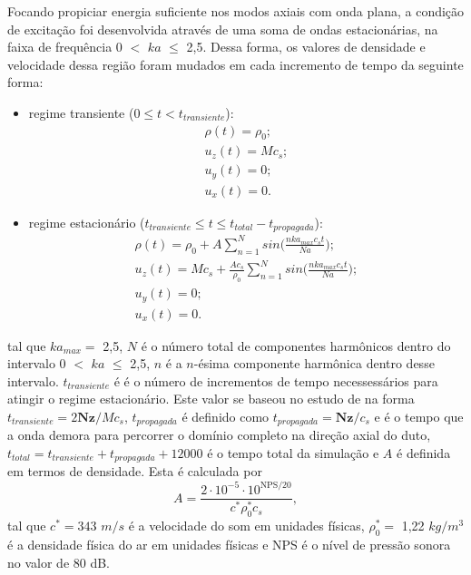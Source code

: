 Focando propiciar energia suficiente nos modos axiais com onda plana, a condição de excitação foi desenvolvida através de uma soma de ondas estacionárias, na faixa de frequência $0$ $<$ $ka$ $\leq$ 2,5. Dessa forma, os valores de densidade e velocidade dessa região foram mudados em cada incremento de tempo da seguinte forma:
\begin{itemize}
  \item regime transiente ($0 \leq t < t_{transiente}$):
  \begin{gather*}
    \rho(t) = \rho_{0};%
    \\ u_{z}(t) = Mc_{s};    
    \\ u_{y}(t) = 0;
    \\ u_{x}(t) = 0.
  \label{eq:transiente}
  \end{gather*}

  \item regime estacionário ($t_{transiente} \leq t \leq t_{total} - t_{propagada}$):
  \begin{gather*}
    \rho(t) = \rho_{0} + A\sum_{n=1}^{N} sin\bigg(\frac{nka_{max}c_{s}t}{Na}\bigg);
    \\ u_{z}(t) = Mc_{s} + \frac{Ac_{s}}{\rho_{0}}\sum_{n=1}^{N} sin\bigg(\frac{nka_{max}c_{s}t}{Na}\bigg);    
    \\ u_{y}(t) = 0;
    \\ u_{x}(t) = 0.
  \label{eq:estacionario}
  \end{gather*}
\end{itemize}
tal que $ka_{max} =$ 2,5, $N$ é o número total de componentes harmônicos dentro do intervalo $0$ $<$ $ka$ $\leq$ 2,5, $n$ é a $n$-ésima componente harmônica dentro desse intervalo. $t_{transiente}$ é é o número de incrementos de tempo necessessários para atingir o regime estacionário. Este valor se baseou no estudo de  na forma $t_{transiente} =  2\textbf{Nz}/Mc_{s}$, $t_{propagada}$ é definido como $t_{propagada} = \textbf{Nz}/c_{s}$ e é o tempo que a onda demora para percorrer o domínio completo na direção axial do duto, $t_{total} = t_{transiente} + t_{propagada} + 12000$ é o tempo total da simulação e $A$ é definida em termos de densidade. Esta é calculada por
\begin{equation}
  A = \frac{2 \cdot 10^{-5} \cdot 10^{\text{NPS}/20}}{c^{*}\rho^{*}_{0}c_{s}},
\end{equation}
tal que $c^{*} = 343$ $m/s$ é a velocidade do som em unidades físicas, $\rho^{*}_{0} =$ 1,22 $kg/m^{3}$ é a densidade física do ar em unidades físicas e NPS é o nível de pressão sonora no valor de 80 dB.


